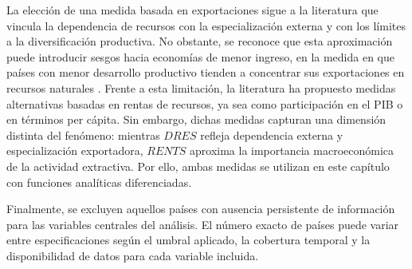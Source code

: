 \documentclass[../../PTFM.tex]{subfiles}
\begin{document}
	La elección de una medida basada en exportaciones sigue a la literatura
	que vincula la dependencia de recursos con la especialización externa y
	con los límites a la diversificación productiva. No obstante, se reconoce
	que esta aproximación puede introducir sesgos hacia economías de menor
	ingreso, en la medida en que países con menor desarrollo productivo
	tienden a concentrar sus exportaciones en recursos naturales
	\parencite{Brunnschweiler2008}. Frente a esta limitación, la literatura ha
	propuesto medidas alternativas basadas en rentas de recursos, ya sea como
	participación en el PIB o en términos per cápita. Sin embargo, dichas
	medidas capturan una dimensión distinta del fenómeno: mientras $DRES$
	refleja dependencia externa y especialización exportadora, $RENTS$
	aproxima la importancia macroeconómica de la actividad extractiva. Por
	ello, ambas medidas se utilizan en este capítulo con funciones analíticas
	diferenciadas.

	Finalmente, se excluyen aquellos países con ausencia persistente de
	información para las variables centrales del análisis. El número exacto
	de países puede variar entre especificaciones según el umbral aplicado,
	la cobertura temporal y la disponibilidad de datos para cada variable
	incluida.
\end{document}

